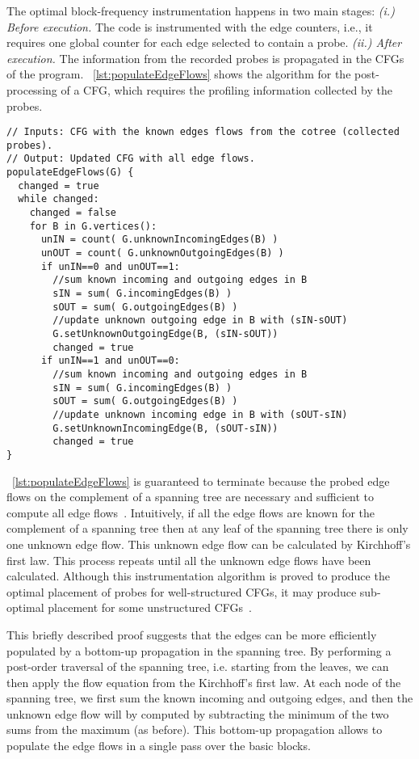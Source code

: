 The optimal block-frequency instrumentation happens in two main stages:
\textit{(i.) Before execution.} The code is instrumented with the edge counters, i.e., it requires one global counter for each edge selected to contain a probe.
\textit{(ii.) After execution.} The information from the recorded probes is propagated in the CFGs of the program.
\lstlistingname~\ref{lst:populateEdgeFlows} shows the algorithm for the post-processing of a CFG, which requires the profiling information collected by the probes.

\begin{lstlisting}[caption={Post-processing of the CFG for populating all edge flows based on the collected probes.}, label={lst:populateEdgeFlows}, float]
// Inputs: CFG with the known edges flows from the cotree (collected probes).
// Output: Updated CFG with all edge flows.
populateEdgeFlows(G) {
  changed = true
  while changed:
    changed = false
    for B in G.vertices():
      unIN = count( G.unknownIncomingEdges(B) )
      unOUT = count( G.unknownOutgoingEdges(B) )
      if unIN==0 and unOUT==1:
        //sum known incoming and outgoing edges in B
        sIN = sum( G.incomingEdges(B) )
        sOUT = sum( G.outgoingEdges(B) )
        //update unknown outgoing edge in B with (sIN-sOUT)
        G.setUnknownOutgoingEdge(B, (sIN-sOUT))
        changed = true
      if unIN==1 and unOUT==0:
        //sum known incoming and outgoing edges in B
        sIN = sum( G.incomingEdges(B) )
        sOUT = sum( G.outgoingEdges(B) )
        //update unknown incoming edge in B with (sOUT-sIN)
        G.setUnknownIncomingEdge(B, (sOUT-sIN))
        changed = true
}
\end{lstlisting}

\lstlistingname~\ref{lst:populateEdgeFlows} is guaranteed to terminate because the probed edge flows on the complement of a spanning tree are necessary and sufficient to compute all edge flows~\citep{nahapetian73,forman81}.
Intuitively, if all the edge flows are known for the complement of a spanning tree then at any leaf of the spanning tree there is only one unknown edge flow.
This unknown edge flow can be calculated by Kirchhoff's first law.
This process repeats until all the unknown edge flows have been calculated.
Although this instrumentation algorithm is proved to produce the optimal placement of probes for well-structured CFGs, it may produce sub-optimal placement for some unstructured CFGs~\citep{ball94}.

This briefly described proof suggests that the edges can be more efficiently populated by a bottom-up propagation in the spanning tree.
By performing a post-order traversal of the spanning tree, i.e. starting from the leaves, we can then apply the flow equation from the Kirchhoff's first law.
At each node of the spanning tree, we first sum the known incoming and outgoing edges, and then the unknown edge flow will by computed by subtracting the minimum of the two sums from the maximum (as before).
This bottom-up propagation allows to populate the edge flows in a single pass over the basic blocks.

